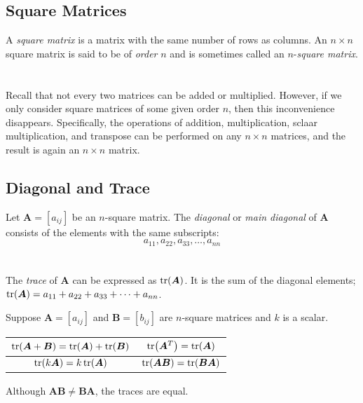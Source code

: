 \documentclass[../setup.tex]{subfiles}
\newcommand{\tr}[1]{\operatorname{tr}\mleft(#1\mright)} %
\begin{document}
\subsection{Square Matrices}
A \textit{square matrix} is a matrix with the same number of rows as columns. An $n \times n$ square matrix is said to be of \textit{order} $n$ and is sometimes called an $n$-\textit{square matrix}.\\
\phantom \\ \\
Recall that not every two matrices can be added or multiplied. However, if we only consider square matrices of some given order $n$, then this inconvenience disappears. Specifically, the operations of addition, multiplication, sclaar multiplication, and transpose can be performed on any $n \times n$ matrices, and the result is again an $n \times n$ matrix. \\


\subsection{Diagonal and Trace}
Let $\bm{A} = [a_{ij}]$ be an $n$-square matrix. The \textit{diagonal} or \textit{main diagonal} of $\bm{A}$ consists of the elements with the same subscripts: \\
	\[a_{11}, a_{22}, a_{33}, \dots, a_{nn}\]
\phantom \\ \\
The \textit{trace} of $\bm{A}$ can be expressed as $\tr{\bm{A}}$. It is the sum of the diagonal elements; $\tr{\bm{A}} = a_{11} + a_{22} + a_{33} + \dots + a_{nn}$. \\
\begin{theorem}
Suppose $\bm{A} = [a_{ij}]$ and $\bm{B} = [b_{ij}]$ are $n$-square matrices and $k$ is a scalar. \\
\begin{center}
\begin{tabular}[t]{| c | c |}
\hline
	$\tr{\bm{A} + \bm{B}} = \tr{\bm{A}} + \tr{\bm{B}}$ & $\tr{\bm{A}^T} = \tr{\bm{A}}$ \\
\hline
	$\tr{k\bm{A}} = k\tr{\bm{A}}$ & $\tr{\bm{AB}} = \tr{\bm{BA}}$ \\
\hline
\end{tabular}
\end{center}
Although $\bm{AB} \neq \bm{BA}$, the traces are equal.
\end{theorem}
\end{document}
